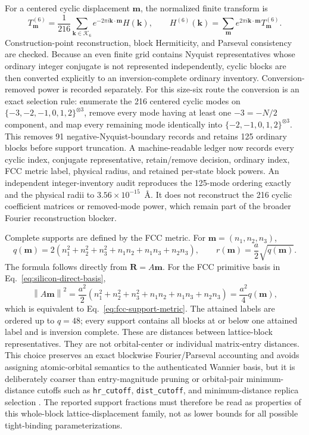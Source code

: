 \documentclass[11pt]{article}
\theoremstyle{definition}
\newcommand{\norm}[1]{\left\lVert#1\right\rVert}
\newcommand{\kvec}{\mathbf k}
\newcommand{\Rvec}{\mathbf R}
\begin{document}
For a centered cyclic displacement $\mathbf m$, the normalized finite transform is
\begin{equation}
 T^{(6)}_{\mathbf m}=\frac{1}{216}
 \sum_{\kvec\in\mathcal K_6}e^{-2\pi i\kvec\cdot\mathbf m}H(\kvec),
 \qquad
 H^{(6)}(\kvec)=\sum_{\mathbf m}e^{2\pi i\kvec\cdot\mathbf m}T^{(6)}_{\mathbf m}.
 \label{eq:finite-cyclic-transform}
\end{equation}
Construction-point reconstruction, block Hermiticity, and Parseval consistency are
checked.  Because an even finite grid contains Nyquist representatives whose ordinary
integer conjugate is not represented independently, cyclic blocks are then converted
explicitly to an inversion-complete ordinary inventory.  Conversion-removed power is
recorded separately.  For this size-six route the conversion is an exact selection rule: enumerate the 216
centered cyclic modes on $\{-3,-2,-1,0,1,2\}^{\otimes3}$, remove every mode having at
least one $-3=-N/2$ component, and map every remaining mode identically into
$\{-2,-1,0,1,2\}^{\otimes3}$.  This removes 91 negative-Nyquist-boundary records and
retains 125 ordinary blocks before support truncation.  A machine-readable ledger now
records every cyclic index, conjugate representative, retain/remove decision, ordinary
index, FCC metric label, physical radius, and retained per-state block powers.  An
independent integer-inventory audit reproduces the 125-mode ordering exactly and the
physical radii to $3.56\times10^{-15}$~\AA.  It does not reconstruct the 216 cyclic
coefficient matrices or removed-mode power, which remain part of the broader Fourier
reconstruction blocker.

Complete supports are defined by the FCC metric.  For
$\mathbf m=(n_1,n_2,n_3)$,
\begin{equation}
 q(\mathbf m)=2(n_1^2+n_2^2+n_3^2+n_1n_2+n_1n_3+n_2n_3),
 \qquad
 r(\mathbf m)=\frac{a}{2}\sqrt{q(\mathbf m)}.
 \label{eq:fcc-support-metric}
\end{equation}
The formula follows directly from $\Rvec=A\mathbf m$.  For the FCC primitive basis in
Eq.~\eqref{eq:silicon-direct-basis},
\begin{equation}
 \norm{A\mathbf m}^2=\frac{a^2}{2}
 (n_1^2+n_2^2+n_3^2+n_1n_2+n_1n_3+n_2n_3)
 =\frac{a^2}{4}q(\mathbf m),
 \label{eq:fcc-radius-derivation}
\end{equation}
which is equivalent to Eq.~\eqref{eq:fcc-support-metric}.  The attained labels are
ordered up to $q=48$; every support contains all blocks at or below one attained label
and is inversion complete.  These are distances between lattice-block representatives.
They are not orbital-center or individual matrix-entry distances.  This choice preserves
an exact blockwise Fourier/Parseval accounting and avoids assigning atomic-orbital
semantics to the authenticated Wannier basis, but it is deliberately coarser than
entry-magnitude pruning or orbital-pair minimum-distance cutoffs such as
\texttt{hr\_cutoff}, \texttt{dist\_cutoff}, and minimum-distance replica selection
\cite{pizzi2020,jung2013}.  The reported support fractions must therefore be read as
properties of this whole-block lattice-displacement family, not as lower bounds for all
possible tight-binding parameterizations.
\end{document}
